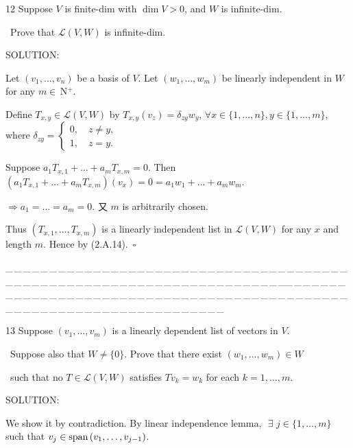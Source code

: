 \documentclass[a4paper, 11pt, UTF8]{article}
\def\Spn{\textup{span}\,}
\def\Lm{\mathcal{L}}
\def\Nbp{$\,{\timesbf N}$^+}
\begin{document}
\begin{large}
{\timesbf\Large 12} {\timessl\Large 
Suppose $V$ is finite-dim with $\dim V > 0$, and $W$ is infinite-dim.}\par\quad\,
{\timessl\Large Prove that $\Lm(V, W)$ is infinite-dim.
}\par
{\timesbf S\footnotesize{OLUTION:}}\par\quad
Let $(v_1,\dots,v_n)$ be a basis of $V$. Let $(w_1,\dots,w_m)$ be linearly independent in $W$ for any $m\in\Nbp$.\par\quad
Define $T_{x,y}\in\Lm(V,W)$ by $T_{x,y}(v_z)=\delta_{zy} w_y$, $\forall x\in\{1,\dots,n\},y\in\{1,\dots,m\}$, where $\delta_{zy}=\left\{\begin{array}{l}
0,\quad z\neq y,\\
1,\quad z=y.
\end{array}\right.$\par\quad
Suppose $a_1 T_{x,1}+\dots+a_m T_{x,m}=0$. Then $(a_1 T_{x,1}+\dots+a_m T_{x,m})(v_x)=0=a_1 w_1+\dots+a_m w_m.$\par\quad
$\Rightarrow a_1=\dots=a_m=0.$ 又 $m$ is arbitrarily chosen.\par\quad
Thus $(T_{x,1},\dots,T_{x,m})$ is a linearly independent list in $\Lm(V,W)$ for any $x$ and length $m$. Hence by (2.A.14).$\,\,\,\square$\par
{\tiny \_\,\_\,\_\,\_\,\_\,\_\,\_\,\_\,\_\,\_\,\_\,\_\,\_\,\_\,\_\,\_\,\_\,\_\,\_\,\_\,\_\,\_\,\_\,\_\,\_\,\_\,\_\,\_\,\_\,\_\,\_\,\_\,\_\,\_\,\_\,\_\,\_\,\_\,\_\,\_\,\_\,\_\,\_\,\_\,\_\,\_\,\_\,\_\,\_\,\_\,\_\,\_\,\_\,\_\,\_\,\_\,\_\,\_\,\_\,\_\,\_\,\_\,\_\,\_\,\_\,\_\,\_\,\_\,\_\,\_\,\_\_\,\_\,\_\,\_\,\_\,\_\,\_\,\_\,\_\,\_\,\_\,\_\,\_\,\_\,\_\,\_\,\_\,\_\,\_\,\_\,\_\,\_\,\_\,\_\,\_\,\_\,\_\,\_\,\_\,\_\,\_\,\_\,\_\,\_\,\_\,\_\,\_\,\_\,\_\,\_\,\_\,\_\,\_\,\_\,\_\,\_\,\_\,\_\,\_\,\_\,\_\,\_\,\_\,\_\,\_\,\_\,\_\,\_\,\_\,\_\,\_\,\_\,\_\,\_\,\_\,\_\,\_\,\_\,\_\,\_\,\_}\par
\large
{\timesbf\Large 13} {\timessl\Large 
Suppose $(v_1,\dots,v_m)$ is a linearly dependent list of vectors in $V$.}\par\quad\,
{\timessl\Large Suppose also that $W\neq\{0\}$. Prove that there exist $(w_1,\dots,w_m)\in W$}\par\quad\,
{\timessl\Large such that no $T\in\Lm(V, W)$ satisfies $Tv_k=w_k$ for each $k = 1,\dots,m$.
}\par
{\timesbf S\footnotesize{OLUTION:}}\par\quad
We show it by contradiction. By linear independence lemma, $\,\,\exists\,\,j\in\{1,\dots,m\}$ such that $v_j\in\Spn(v_1,\dots,v_{j-1})$.\par\quad

\end{large}
\end{document}
